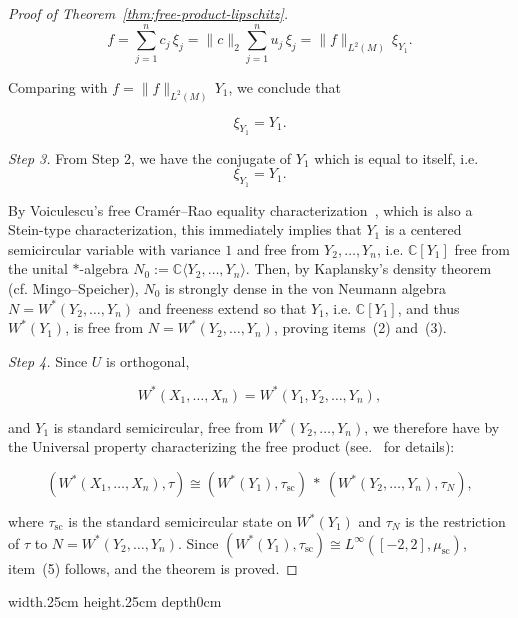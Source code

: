 \documentclass[10pt,a4paper,reqno]{amsart}
\def\qed{ \hfill \vrule width.25cm height.25cm depth0cm\smallskip}
\begin{document}
\begin{proof}[Proof of Theorem~\ref{thm:free-product-lipschitz}]
\[
  f=\sum_{j=1}^n c_j\,\xi_j
   =\|c\|_2\sum_{j=1}^n u_j\,\xi_j
   =\|f\|_{L^2(M)}\,\xi_{Y_1}.
\]


Comparing with $f=\|f\|_{L^2(M)}\,Y_1$, we conclude that


\[
  \xi_{Y_1}=Y_1.
\]



\medskip

\medskip
\noindent\textit{Step 3.} From Step 2, we have the conjugate of $Y_1$ which is equal to itself, i.e. 
\[
\xi_{Y_1} = Y_1.
\]

By Voiculescu’s free Cramér--Rao equality characterization~\cite[Proposition~6.9]{V}, which is also a Stein-type characterization, this immediately implies that $Y_1$ is a centered semicircular variable with variance $1$ and free from $Y_2,\ldots,Y_n$, i.e. $\mathbb{C}[Y_1]$ free from the unital $*$-algebra $N_0 := \mathbb{C}\langle Y_2, \dots, Y_n \rangle$. Then, by Kaplansky’s density theorem (cf. Mingo--Speicher\cite[Proposition~5]{MS}), $N_0$ is strongly dense in the von Neumann algebra $N = W^\ast(Y_2, \dots, Y_n)$ and freeness extend so that
$Y_1$, i.e. $\mathbb{C}[Y_1]$, and thus $W^*(Y_1)$, is free from $N = W^\ast(Y_2, \dots, Y_n)$, proving items~\textnormal{(2)} and~\textnormal{(3)}.

\medskip
\noindent\textit{Step 4.}
Since $U$ is orthogonal,



\[
  W^\ast(X_1,\ldots,X_n)=W^\ast(Y_1,Y_2,\ldots,Y_n),
\]


and $Y_1$ is standard semicircular, free from $W^\ast(Y_2,\ldots,Y_n)$, we therefore have by the Universal property characterizing the free product (see.~\cite{VD} for details):


\[
  (W^\ast(X_1,\ldots,X_n),\tau)
  \cong
  (W^\ast(Y_1),\tau_{\mathrm{sc}})\ *\ (W^\ast(Y_2,\ldots,Y_n),\tau_N),
\]


where $\tau_{\mathrm{sc}}$ is the standard semicircular state on $W^\ast(Y_1)$ and $\tau_N$ is the
restriction of $\tau$ to $N=W^\ast(Y_2,\ldots,Y_n)$. Since
$(W^\ast(Y_1),\tau_{\mathrm{sc}})\cong L^\infty([-2,2],\mu_{\mathrm{sc}})$, item~(5) follows, and the
theorem is proved.
\end{proof}
\qed
\end{document}

